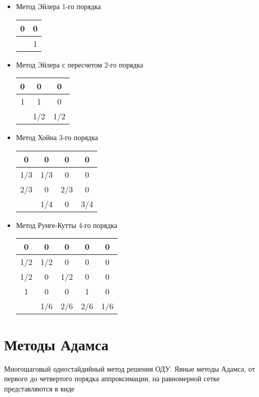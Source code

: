 \documentclass[a4paper,12pt]{article} %
\begin{document}
\begin{itemize}
	\item Метод Эйлера 1-го порядка \\
	\begin{tabular}[H]{|c|c|}
		\hline
		0 & 0 \\ \hline
		& 1 \\
		\hline
	\end{tabular}

	\item Метод Эйлера с пересчетом 2-го порядка\\
	\begin{tabular}[H]{|c|c|c|}
		\hline
		0 & 0 & 0\\ \hline
		1 & 1 & 0\\ \hline
		& 1/2 & 1/2 \\
		\hline
	\end{tabular}

	\item Метод Хойна 3-го порядка\\
	\begin{tabular}[H]{|c|c|c|c|}
		\hline
		0 & 0 & 0 & 0\\ \hline
		1/3 & 1/3 & 0 & 0\\ \hline
		2/3 & 0 & 2/3 & 0 \\ \hline
		& 1/4 & 0 & 3/4 \\
		\hline
	\end{tabular}

	\item Метод Рунге-Кутты 4-го порядка \\
	\begin{tabular}[H]{|c|c|c|c|c|}
		\hline
		0 & 0 & 0 & 0 & 0\\ \hline
		1/2 & 1/2 & 0 & 0 & 0\\ \hline
		1/2 & 0 & 1/2 & 0 & 0 \\ \hline
		1 & 0 & 0 & 1 & 0 \\ \hline
		& 1/6 & 2/6 & 2/6 & 1/6 \\
		\hline
	\end{tabular}
\end{itemize}

\section*{Методы Адамса}
Многошаговый одностайдийный метод решения ОДУ. Явные методы Адамса, от первого до четвертого порядка аппроксимации, на равномерной сетке представляются в виде
\end{document}
